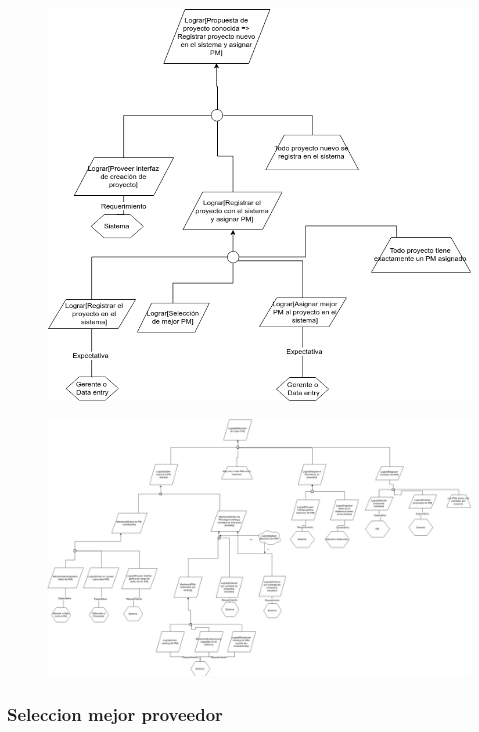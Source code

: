 \vspace{1em}

\begin{figure}[H]
    \centering
    \includegraphics[width=\textwidth]{imagenes/objetivos-creacion-2.png}
\end{figure}

\begin{figure}[H]
    \centering
    \includegraphics[width=10in, keepaspectratio, angle=90]{imagenes/objetivos-seleccion-mejor-pm.png}
\end{figure}

\subsubsection{Seleccion mejor proveedor}

